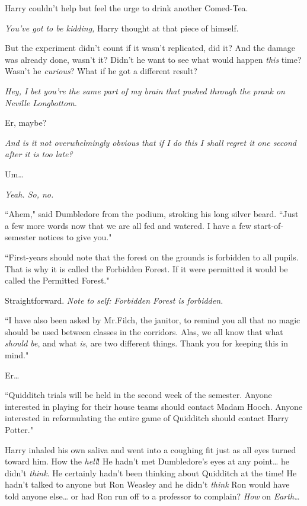 Harry couldn't help but feel the urge to drink another Comed-Tea.

\emph{You've \emph{got} to be kidding,} Harry thought at that piece of himself.

But the experiment didn't count if it wasn't replicated, did it? And the damage was already done, wasn't it? Didn't he want to see what would happen \emph{this} time? Wasn't he \emph{curious}? What if he got a different result?

\emph{Hey, I bet you're the same part of my brain that pushed through the prank on Neville Longbottom.}

Er, maybe?

\emph{And is it not \emph{overwhelmingly} obvious that if I do this I shall regret it one second after it is too late?}

Um{\ldots}

\emph{Yeah. So, \emph{no}.}

``Ahem," said Dumbledore from the podium, stroking his long silver beard. ``Just a few more words now that we are all fed and watered. I have a few start-of-semester notices to give you."

``First-years should note that the forest on the grounds is forbidden to all pupils. That is why it is called the Forbidden Forest. If it were permitted it would be called the Permitted Forest."

Straightforward. \emph{Note to self: Forbidden Forest is forbidden.}

``I have also been asked by Mr.\?Filch, the janitor, to remind you all that no magic should be used between classes in the corridors. Alas, we all know that what \emph{should be}, and what \emph{is}, are two different things. Thank you for keeping this in mind."

Er{\ldots}

``Quidditch trials will be held in the second week of the semester. Anyone interested in playing for their house teams should contact Madam Hooch. Anyone interested in reformulating the entire game of Quidditch should contact Harry Potter."

Harry inhaled his own saliva and went into a coughing fit just as all eyes turned toward him. How the \emph{hell}! He hadn't met Dumbledore's eyes at any point{\ldots} he didn't \emph{think}. He certainly hadn't been thinking about Quidditch at the time! He hadn't talked to anyone but Ron Weasley and he didn't \emph{think} Ron would have told anyone else{\ldots} or had Ron run off to a professor to complain? \emph{How} on \emph{Earth{\ldots}}

